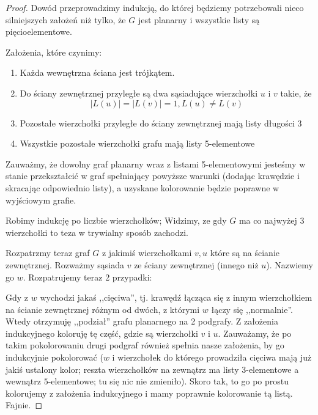             \begin{proof}
                    Dowód przeprowadzimy indukcją, do której będziemy potrzebowali nieco silniejszych założeń niż tylko, że $G$ jest planarny i wszystkie listy są pięcioelementowe.
                    
                    Założenia, które czynimy:
                    \begin{enumerate}
                        \item Każda wewnętrzna ściana jest trójkątem.
                        \item Do ściany zewnętrznej przyległe są dwa sąsiadujące wierzchołki $u$ i $v$ takie, że
                        $$ |L(u)| = |L(v)| = 1, L(u) \neq L(v) $$
                        \item Pozostałe wierzchołki przyległe do ściany zewnętrznej mają listy długości 3
                        \item Wszystkie pozostałe wierzchołki grafu mają listy 5-elementowe
                    \end{enumerate}
                    
                    Zauważmy, że dowolny graf planarny wraz z listami 5-elementowymi jesteśmy w stanie przekształcić w graf spełniający powyższe warunki (dodając krawędzie i skracając odpowiednio listy), a uzyskane kolorowanie będzie poprawne w wyjściowym grafie.
                 
                    Robimy indukcję po liczbie wierzchołków; Widzimy, ze gdy $G$ ma co najwyżej 3 wierzchołki to teza w trywialny sposób zachodzi.

                    Rozpatrzmy teraz graf $G$ z jakimiś wierzchołkami $v, u$ które są na ścianie zewnętrznej. Rozważmy sąsiada $v$ ze ściany zewnętrznej (innego niż $u$). Nazwiemy go $w$. Rozpatrujemy teraz 2 przypadki: 

                    Gdy z $w$ wychodzi jakaś ,,cięciwa'', tj. krawędź łącząca się z innym wierzchołkiem na ścianie zewnętrznej różnym od dwóch, z którymi $w$ łączy się ,,normalnie''. Wtedy otrzymuję ,,podział'' grafu planarnego na 2 podgrafy. Z założenia indukcyjnego koloruję tę część, gdzie są wierzchołki $v$ i $u$. Zauważamy, że po takim pokolorowaniu drugi podgraf również spełnia nasze założenia, by go indukcyjnie pokolorować ($w$ i wierzchołek do którego prowadziła cięciwa mają już jakiś ustalony kolor; reszta wierzchołków na zewnątrz ma listy $3$-elementowe a wewnątrz $5$-elementowe; tu się nic nie zmieniło). Skoro tak, to go po prostu kolorujemy z założenia indukcyjnego i mamy poprawnie kolorowanie tą listą. Fajnie. 
                    

\end{proof}
